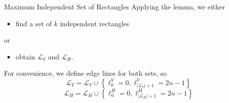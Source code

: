\documentclass[handout,usenames,dvipsnames]{beamer}
\begin{document}
\begin{frame}{Maximum Independent Set of Rectangles}
    Applying the lemma, we either 
    \begin{itemize}
        \pause
        \item find a set of $k$ independent rectangles
    \end{itemize} 
    \pause
    or
    \begin{itemize}
        \pause
        \item obtain $\mathcal L_{V}$ and $\mathcal L _{H}.$
    \end{itemize}
    \pause
    For convenience, we define edge lines for both sets, so
    $$
        \mathcal L_V = \mathcal L_V \cup \left\{\ell_0^V = 0, \ell_{|\mathcal L_V| + 1}^V = 2n - 1\right\}
    $$
    \pause
    $$
        \mathcal L_H = \mathcal L_H \cup \left\{\ell_0^H = 0, \ell_{|\mathcal L_H| + 1}^H = 2n - 1\right\}
    $$
\end{frame}
\end{document}
